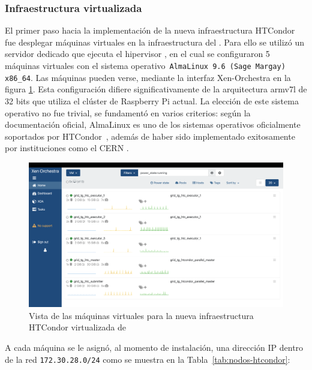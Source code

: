 \FloatBarrier\subsubsection{Infraestructura virtualizada}

El primer paso hacia la implementación de la nueva infraestructura HTCondor fue desplegar máquinas virtuales en la infraestructura del \GRID. Para ello se utilizó un servidor dedicado que ejecuta el hipervisor \cite{xcpng_intro}, en el cual se configuraron 5 máquinas virtuales con el sistema operativo~\texttt{AlmaLinux 9.6 (Sage Margay) x86\_64}. Las máquinas pueden verse, mediante la interfaz Xen-Orchestra en la figura \ref{fig:xen-vms}. Esta configuración difiere significativamente de la arquitectura armv7l de 32 bits que utiliza el clúster de Raspberry Pi actual. La elección de este sistema operativo no fue trivial, se fundamentó en varios criterios: según la documentación oficial, AlmaLinux es uno de los sistemas operativos oficialmente soportados por HTCondor~\cite{HTCondor_install}, además de haber sido implementado exitosamente por instituciones como el CERN \citep{Bunsic2025}.

\begin{figure}
	\centering
	\includegraphics[scale=0.25]{apendices/infra-virtual/xen-vms.png}
	\caption{Vista de las máquinas virtuales para la nueva infraestructura HTCondor virtualizada de \GRID}
	\label{fig:xen-vms}
\end{figure}

A cada máquina se le asignó, al momento de instalación, una dirección IP dentro de la red \texttt{172.30.28.0/24} como se muestra en la Tabla~\ref{tab:nodos-htcondor}:

